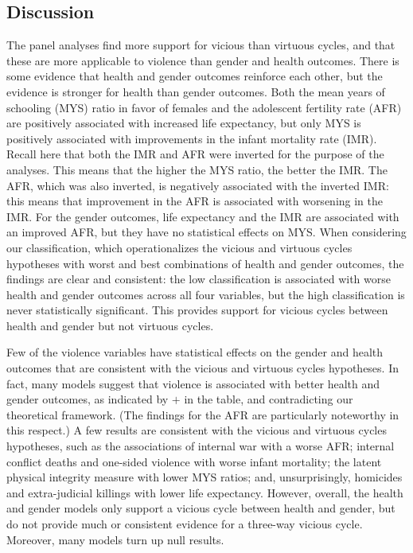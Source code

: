 \documentclass[12pt]{article}
\begin{document}
\subsection{Discussion}

The panel analyses find more support for vicious than virtuous cycles, and that these are more applicable to violence than gender and health outcomes.
There is some evidence that health and gender outcomes reinforce each other, but the evidence is stronger for health than gender outcomes. Both the mean years of schooling (MYS) ratio in favor of females and the adolescent fertility rate (AFR) are positively associated with increased life expectancy, but only MYS is positively associated with improvements in the infant mortality rate (IMR). Recall here that both the IMR and AFR were inverted for the purpose of the analyses. This means that the higher the MYS ratio, the better the IMR. The AFR, which was also inverted, is negatively associated with the inverted IMR: this means that improvement in the AFR is associated with worsening in the IMR. For the gender outcomes, life expectancy and the IMR are associated with an improved AFR, but they have no statistical effects on MYS. When considering our classification, which operationalizes the vicious and virtuous cycles hypotheses with worst and best combinations of health and gender outcomes, the findings are clear and consistent: the low classification is associated with worse health and gender outcomes across all four variables, but the high classification is never statistically significant. This provides support for vicious cycles between health and gender but not virtuous cycles.

Few of the violence variables have statistical effects on the gender and health outcomes that are  consistent with the vicious and virtuous cycles hypotheses. In fact, many models suggest that violence is associated with better health and gender outcomes, as indicated by $+$ in the table, and contradicting our theoretical framework. (The findings for the AFR are particularly noteworthy in this respect.) A few results are consistent with the vicious and virtuous cycles hypotheses, such as the associations of internal war with a worse AFR; internal conflict deaths and one-sided violence with worse infant mortality; the latent physical integrity measure with lower MYS ratios; and, unsurprisingly, homicides and extra-judicial killings with lower life expectancy. However, overall, the health and gender models only support a vicious cycle between health and gender, but do not provide much or consistent evidence for a three-way vicious cycle. Moreover, many models turn up null results.
\end{document}
